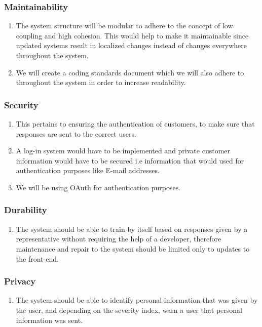 \documentclass[11pt]{article}
\begin{document}
\subsubsection{Maintainability}
\begin{enumerate}
	\item The system structure will be modular to adhere to the concept of low coupling and high cohesion. This would help to make it maintainable since updated systems result in localized changes instead of changes everywhere throughout the system.
	\item We will create a coding standards document which we will also adhere to throughout the system in order to increase readability.
\end{enumerate}

\subsubsection{Security}
\begin{enumerate}
	\item This pertains to ensuring the authentication of customers, to make sure that responses are sent to the correct users.
	\item A log-in system would have to be implemented and private customer information would have to be secured i.e information that would used for authentication purposes like E-mail addresses.
	\item We will be using OAuth for authentication purposes.
\end{enumerate}

\subsubsection{Durability}
\begin{enumerate}
	\item The system should be able to train by itself based on responses given by a representative without requiring the help of a developer, therefore maintenance and repair to the system should be limited only to updates to the front-end.
\end{enumerate}

\subsubsection{Privacy}
\begin{enumerate}
	\item The system should be able to identify personal information that was given by the user, and depending on the severity index, warn a user that personal information was sent.
\end{enumerate}
\end{document}
